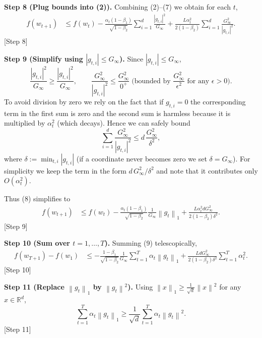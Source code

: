 \documentclass{article}
\newcommand{\R}{\mathbb{R}}
\newcommand{\norm}[1]{\left\|#1\right\|}
\begin{document}
\noindent\textbf{Step 8 (Plug bounds into (2)).}
Combining (2)–(7) we obtain for each $t$,
\begin{align}
    f(w_{t+1}) 
    &\le f(w_{t}) 
       -\frac{\alpha_{t}(1-\beta_{1})}{\sqrt{1-\beta_{2}}}
         \sum_{i=1}^{d}\frac{|g_{t,i}|^{2}}{G_{\infty}}
       +\frac{L\alpha_{t}^{2}}{2(1-\beta_{2})}
         \sum_{i=1}^{d}\frac{G_{\infty}^{2}}{|g_{t,i}|^{2}}. \tag{8}
\end{align}
[Step 8]

\noindent\textbf{Step 9 (Simplify using $|g_{t,i}|\le G_{\infty}$).}
Since $|g_{t,i}|\le G_{\infty}$,
\[
\frac{|g_{t,i}|^{2}}{G_{\infty}} \ge \frac{|g_{t,i}|^{2}}{G_{\infty}},\qquad
\frac{G_{\infty}^{2}}{|g_{t,i}|^{2}} \le \frac{G_{\infty}^{2}}{0^{+}} \;\text{(bounded by } \frac{G_{\infty}^{2}}{\epsilon^{2}}\text{ for any }\epsilon>0).
\]
To avoid division by zero we rely on the fact that if $g_{t,i}=0$ the corresponding term in the first sum is zero and the second sum is harmless because it is multiplied by $\alpha_{t}^{2}$ (which decays).  Hence we can safely bound
\[
\sum_{i=1}^{d}\frac{G_{\infty}^{2}}{|g_{t,i}|^{2}}
\le d\,\frac{G_{\infty}^{2}}{\delta^{2}},
\]
where $\delta:=\min_{t,i}|g_{t,i}|$ (if a coordinate never becomes zero we set $\delta=G_{\infty}$).  For simplicity we keep the term in the form $d\,G_{\infty}^{2}/\delta^{2}$ and note that it contributes only $O(\alpha_{t}^{2})$.

Thus (8) simplifies to
\begin{align}
    f(w_{t+1}) 
    &\le f(w_{t})
       -\frac{\alpha_{t}(1-\beta_{1})}{\sqrt{1-\beta_{2}}}\frac{1}{G_{\infty}}\norm{g_{t}}_{1}
       +\frac{L\alpha_{t}^{2}d G_{\infty}^{2}}{2(1-\beta_{2})\delta^{2}}. \tag{9}
\end{align}
[Step 9]

\noindent\textbf{Step 10 (Sum over $t=1,\dots,T$).}
Summing (9) telescopically,
\begin{align}
    f(w_{T+1}) - f(w_{1})
    &\le -\frac{1-\beta_{1}}{\sqrt{1-\beta_{2}}}\frac{1}{G_{\infty}}
        \sum_{t=1}^{T}\alpha_{t}\norm{g_{t}}_{1}
        +\frac{L d G_{\infty}^{2}}{2(1-\beta_{2})\delta^{2}}
          \sum_{t=1}^{T}\alpha_{t}^{2}. \tag{10}
\end{align}
[Step 10]

\noindent\textbf{Step 11 (Replace $\norm{g_{t}}_{1}$ by $\norm{g_{t}}^{2}$).}
Using $\norm{x}_{1}\ge \frac{1}{\sqrt{d}}\norm{x}^{2}$ for any $x\in\R^{d}$,
\[
\sum_{t=1}^{T}\alpha_{t}\norm{g_{t}}_{1}
\ge \frac{1}{\sqrt{d}}\sum_{t=1}^{T}\alpha_{t}\norm{g_{t}}^{2}. \tag{11}
\]
[Step 11]
\end{document}
